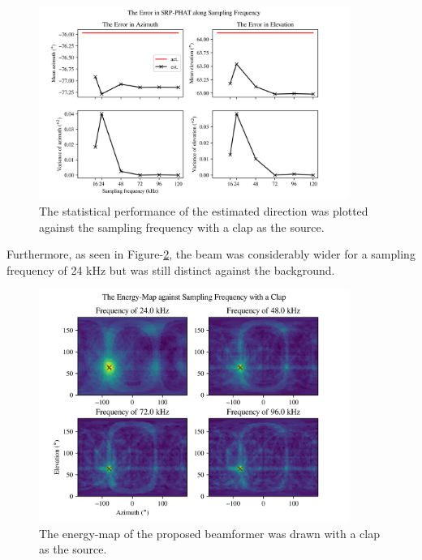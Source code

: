\documentclass[notitlepage]{report}
\begin{document}
\begin{figure}[H]
\includegraphics[width=0.9\textwidth]{../Python/main_method/frequency/clap/plots.png}
\centering
\caption{The statistical performance of the estimated direction was plotted against the sampling frequency with a clap as the source.}
\label{fig:mm_frequency_plots_clap}
\centering
\end{figure}

Furthermore, as seen in Figure-\ref{fig:mm_frequency_map_clap}, the beam was considerably wider for a sampling frequency of 24 \si{kHz} but was still distinct against the background.

\begin{figure}[H]
\includegraphics[width=0.9\textwidth]{../Python/main_method/frequency/clap/map.png}
\centering
\caption{The energy-map of the proposed beamformer was drawn with a clap as the source.}
\label{fig:mm_frequency_map_clap}
\centering
\end{figure}
\end{document}
